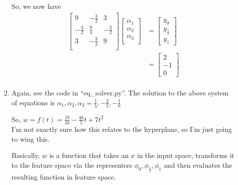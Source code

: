 \documentclass[12pt]{article}
\newcommand{\parens}[1]{\left(#1\right)}
\begin{document}
\begin{enumerate}
\begin{enumerate}
                So, we now have
                \begin{equation}
                    \begin{split}
                        \begin{bmatrix*}
                            9 & -\frac{3}{2} & 3 \\
                            -\frac{3}{2} & \frac{9}{4} & -\frac{3}{2} \\
                            3 & -\frac{3}{2} & 9 \\
                        \end{bmatrix*}
                        \begin{bmatrix*}
                            \alpha_1 \\ \alpha_2 \\ \alpha_3 \\
                        \end{bmatrix*}&=
                        \begin{bmatrix*}
                            y_0 \\ y_\frac{1}{2} \\ y_1
                        \end{bmatrix*} \\&=
                        \begin{bmatrix*}
                            2 \\ -1 \\ 0
                        \end{bmatrix*} \\
                    \end{split}
                \end{equation}
            \item
                Again, see the code in ``eq\_solver.py''.
                The solution to the above system of equations is
                $\alpha_1,\alpha_2,\alpha_3=\frac{1}{5},-\frac{2}{5},-\frac{1}{6}$

                So, $w=f\parens{t}=\frac{19}{10}-\frac{46}{5}t+7t^2$\\

                I'm not exactly sure how this relates to the hyperplane, so
                I'm just going to wing this.

                Basically, $w$ is a function that takes an $x$ in the input
                space, transforms it to the feature space via the representers
                $\phi_0,\phi_\frac{1}{2},\phi_1$ and then evaluates the resulting
                function in feature space.
        \end{enumerate}
\end{enumerate}
\end{document}
